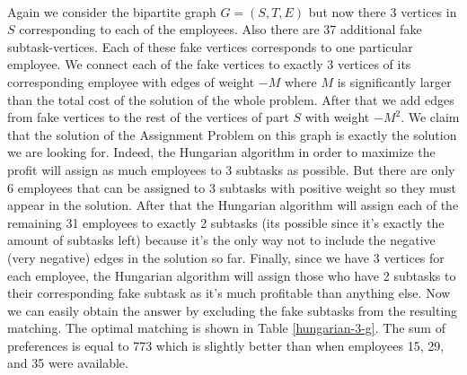 \begin{enumerate}[(a)]
	\paragraph{}
	Again we consider the bipartite graph $G=(S,T,E)$ but now there 3 vertices in $S$ corresponding to each of the employees. Also there are 37 additional fake subtask-vertices. Each of these fake vertices corresponds to one particular employee. We connect each of the fake vertices to exactly 3 vertices of its corresponding employee with edges of weight $-M$ where $M$ is significantly larger than the total cost of the solution of the whole problem. After that we add edges from fake vertices to the rest of the vertices of part $S$ with weight $-M^2$. We claim that the solution of the Assignment Problem on this graph is exactly the solution we are looking for. Indeed, the Hungarian algorithm in order to maximize the profit will assign as much employees to 3 subtasks as possible. But there are only 6 employees that can be assigned to 3 subtasks with positive weight so they must appear in the solution. After that the Hungarian algorithm will assign each of the remaining 31 employees to exactly 2 subtasks (its possible since it's exactly the amount of subtasks left) because it's the only way not to include the negative (very negative) edges in the solution so far. Finally, since we have 3 vertices for each employee, the Hungarian algorithm will assign those who have 2 subtasks to their corresponding fake subtask as it's much profitable than anything else. Now we can easily obtain the answer by excluding the fake subtasks from the resulting matching. The optimal matching is shown in Table \ref{hungarian-3-g}. The sum of preferences is equal to 773 which is slightly better than when employees 15, 29, and 35 were available.


\end{enumerate}
